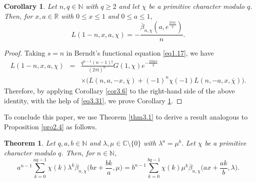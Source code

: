 \documentclass[reqno]{amsart}
\numberwithin{equation}{section}
\newtheorem{theorem}[thm]{Theorem}
\newtheorem{corollary}[thm]{Corollary}
\begin{document}
\begin{corollary}\label{cor3.7} Let $n,q\in\mathbb{N}$ with $q\geqslant2$ and let $\chi$ be a primitive character modulo $q$. Then, for $x,a\in\mathbb{R}$ with $0\leqslant x\leqslant1$ and $0\leqslant a\leqslant1$,
\begin{equation}\label{eq3.35}
L(1-n,x,a,\chi)=-\frac{\overline{\beta}_{n,\chi}(a,e^{\frac{2\pi\mathrm{i}x}{q}})}{n}.
\end{equation}
\end{corollary}

\begin{proof}
Taking $s=n$ in Berndt's functional equation \eqref{eq1.17}, we have
\begin{eqnarray*}
L(1-n,x,a,\chi)&=&\frac{q^{n-1}(n-1)!}{(2\pi \mathrm{i})^{n}}G(1,\chi)e^{-\frac{2\pi \mathrm{i}ax}{q}}\nonumber\\
&&\times\bigl(L(n,a,-x,\overline{\chi})+(-1)^{n}\chi(-1)L(n,-a,x,\overline{\chi})\bigl).
\end{eqnarray*}
Therefore, by applying Corollary \ref{cor3.6} to the right-hand side of the above identity, with the help of \eqref{eq3.31}, we prove Corollary \ref{cor3.7}.
\end{proof}

To conclude this paper, we use Theorem \ref{thm3.1} to derive a result analogous to Proposition \ref{pro2.4} as follows.

\begin{theorem}\label{thm3.8} Let $q,a,b\in\mathbb{N}$ and $\lambda,\mu\in\mathbb{C}\setminus\{0\}$ with $\lambda^{a}=\mu^{b}$. Let $\chi$ be a primitive character modulo $q$. Then, for $n\in\mathbb{N}$,
\begin{equation}\label{eq3.36}
a^{n-1}\sum_{k=0}^{aq-1}\chi(k)\lambda^{k}\overline{\beta}_{n,\chi}\biggl(bx+\frac{bk}{a},\mu\biggl)
=b^{n-1}\sum_{k=0}^{bq-1}\chi(k)\mu^{k}\overline{\beta}_{n,\chi}\biggl(ax+\frac{ak}{b},\lambda\biggl).
\end{equation}
\end{theorem}
\end{document}
